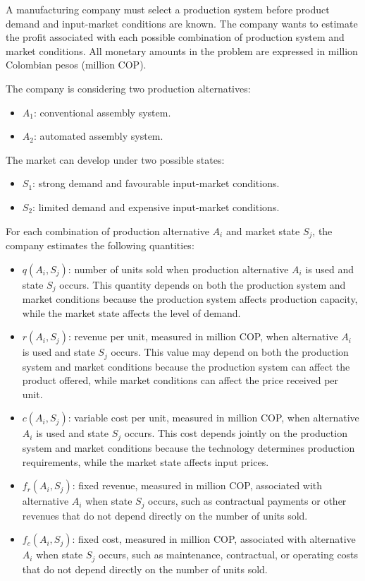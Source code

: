 A manufacturing company must select a production system before product demand
and input-market conditions are known. The company wants to estimate the profit
associated with each possible combination of production system and market
conditions. All monetary amounts in the problem are expressed in million
Colombian pesos (million COP).

The company is considering two production alternatives:

\begin{itemize}
	\item $A_1$: conventional assembly system.
	\item $A_2$: automated assembly system.
\end{itemize}

The market can develop under two possible states:

\begin{itemize}
	\item $S_1$: strong demand and favourable input-market conditions.
	\item $S_2$: limited demand and expensive input-market conditions.
\end{itemize}

For each combination of production alternative $A_i$ and market state $S_j$,
the company estimates the following quantities:

\begin{itemize}
	\item $q(A_i,S_j)$: number of units sold when production alternative
	$A_i$ is used and state $S_j$ occurs. This quantity depends on both the
	production system and market conditions because the production system
	affects production capacity, while the market state affects the level of
	demand.
	
	\item $r(A_i,S_j)$: revenue per unit, measured in million COP, when
	alternative $A_i$ is used and state $S_j$ occurs. This value may depend
	on both the production system and market conditions because the production
	system can affect the product offered, while market conditions can affect
	the price received per unit.
	
	\item $c(A_i,S_j)$: variable cost per unit, measured in million COP, when
	alternative $A_i$ is used and state $S_j$ occurs. This cost depends jointly
	on the production system and market conditions because the technology
	determines production requirements, while the market state affects input
	prices.
	
	\item $f_r(A_i,S_j)$: fixed revenue, measured in million COP, associated
	with alternative $A_i$ when state $S_j$ occurs, such as contractual
	payments or other revenues that do not depend directly on the number of
	units sold.
	
	\item $f_c(A_i,S_j)$: fixed cost, measured in million COP, associated
	with alternative $A_i$ when state $S_j$ occurs, such as maintenance,
	contractual, or operating costs that do not depend directly on the number
	of units sold.
\end{itemize}

